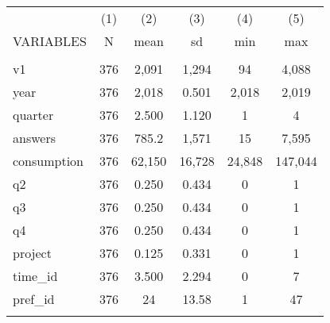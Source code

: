 \documentclass[]{article}
\begin{document}
\begin{tabular}{lccccc} \hline
 & (1) & (2) & (3) & (4) & (5) \\
VARIABLES & N & mean & sd & min & max \\ \hline
 &  &  &  &  &  \\
v1 & 376 & 2,091 & 1,294 & 94 & 4,088 \\
year & 376 & 2,018 & 0.501 & 2,018 & 2,019 \\
quarter & 376 & 2.500 & 1.120 & 1 & 4 \\
answers & 376 & 785.2 & 1,571 & 15 & 7,595 \\
consumption & 376 & 62,150 & 16,728 & 24,848 & 147,044 \\
q2 & 376 & 0.250 & 0.434 & 0 & 1 \\
q3 & 376 & 0.250 & 0.434 & 0 & 1 \\
q4 & 376 & 0.250 & 0.434 & 0 & 1 \\
project & 376 & 0.125 & 0.331 & 0 & 1 \\
time\_id & 376 & 3.500 & 2.294 & 0 & 7 \\
pref\_id & 376 & 24 & 13.58 & 1 & 47 \\
 &  &  &  &  &  \\ \hline
\end{tabular}
\end{document}
